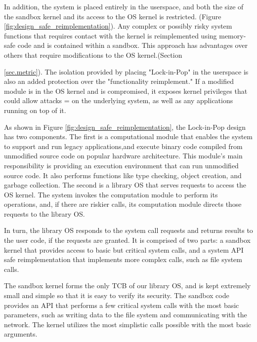 In addition, the system is placed entirely in the userspace, and both the size of
 the sandbox kernel and its access to the OS kernel is restricted.
(Figure \ref{fig:design_safe_reimplementation}). Any complex or possibly risky system
functions that requires contact with the kernel is reimplemented using
memory-safe code and is contained within a sandbox. This approach has advantages
over others that require modifications to
the OS kernel.(Section {\ref{sec.metric}). The isolation provided by placing
"Lock-in-Pop" in the userspace is also an added protection over the "functionality
reimplement." If a modified module is in the OS kernel and is compromised, it
exposes kernel privileges that could allow attacks =
on the underlying system, as well as any applications running on top of it.


As shown in Figure \ref{fig:design_safe_reimplementation}, the Lock-in-Pop design
has two components. The first is a computational module that enables the system to
support and run legacy applications,and execute binary code compiled from unmodified
source code on popular hardware architecture. This module's main responsibility is
providing an execution environment that can run unmodified source code. It also
performs functions like type checking, object creation, and garbage collection.
The second is a library OS that serves requests to access the OS kernel.
The system invokes the computation module to perform its operations,
and, if there are riskier calls, its computation module directs those requests to the
library OS.

In turn, the library OS responds to the system call requests and
returns results to the user code, if the requests are granted.
It is comprised of two parts: a sandbox kernel that provides access to basic but critical
system calls, and a system API safe reimplementation that implements more
complex calls, such as file system calls.

The sandbox kernel forms the only TCB of our library OS, and is kept
extremely small and simple so that it is easy to verify its security.
The sandbox code provides an API that performs a few critical system calls with
the most basic parameters, such as writing data to the file system
and communicating with the network. The kernel utilizes the most simplistic calls
possible with the most
basic arguments.

}
